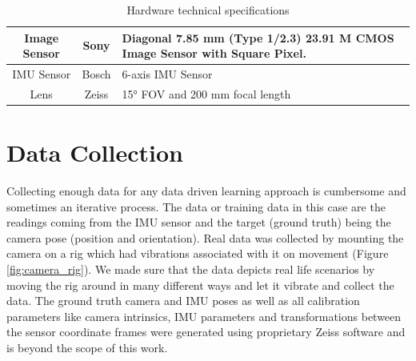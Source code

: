 \begin{table}[H]
    \centering
\begin{tabular}{| c| c | L |}
    \hline
     Image Sensor & 
     Sony & 
     Diagonal 7.85 mm (Type 1/2.3) 23.91 M CMOS Image Sensor with Square Pixel. \\
     \hline
     
     IMU Sensor & 
     Bosch & 
     6-axis IMU Sensor
     \\
     \hline
     
     Lens & 
     Zeiss & 
     15° FOV and 200 mm focal length \\

     \hline

\end{tabular}
    \caption{Hardware technical specifications}
    \label{tab:technical_details}
\end{table}



\section{Data Collection}
\label{sec:data_collection}
Collecting enough data for any data driven learning approach is cumbersome and sometimes an iterative process. The data or training data in this case are the readings coming from the IMU sensor and the target (ground truth) being the camera pose (position and orientation). Real data was collected by mounting the camera on a rig which had vibrations associated with it on movement (Figure \ref{fig:camera_rig}). We made sure that the data depicts real life scenarios by moving the rig around in many different ways and let it vibrate and collect the data. The ground truth camera and IMU poses as well as all calibration parameters like camera intrinsics, IMU parameters and transformations between the sensor coordinate frames were generated using proprietary Zeiss software and is beyond the scope of this work.

